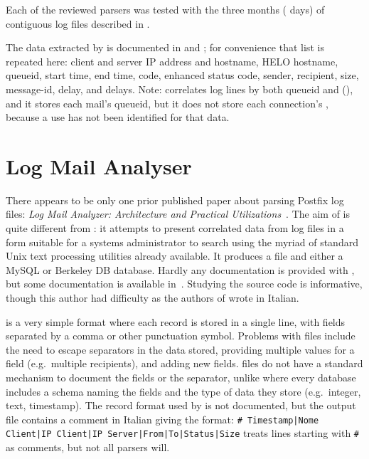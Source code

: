 Each of the reviewed parsers was tested with the three months
(\numberOFlogFILES{} days) of contiguous log files described in
.

The data extracted by \parsername{} is documented in
 and ; for
convenience that list is repeated here: client and server IP address and
hostname, HELO hostname, queueid, start time, end time, 
code, enhanced status code, sender, recipient, size, message-id, delay, and
delays.  Note: \parsername{} correlates log lines by both queueid and
 (), and it stores each mail's
queueid, but it does not store each connection's , because a
use has not been identified for that data.

\section{Log Mail Analyser}

\label{log mail analyser}

There appears to be only one prior published paper about parsing Postfix
log files: \textit{Log Mail Analyzer: Architecture and Practical
Utilizations\/}~\cite{log-mail-analyser}.  The aim of  is
quite different from \parsername{}: it attempts to present correlated data
from log files in a form suitable for a systems administrator to search
using the myriad of standard Unix text processing utilities already
available.  It produces a  file and either a MySQL or Berkeley
DB database.  Hardly any documentation is provided with , but
some documentation is available in~\cite{log-mail-analyser}.  Studying the
source code is informative, though this author had difficulty as the
authors of  wrote in Italian.

 is a very simple format where each record is stored in a
single line, with fields separated by a comma or other punctuation symbol.
Problems with  files include the need to escape separators in
the data stored, providing multiple values for a field (e.g.\ multiple
recipients), and adding new fields.   files do not have a
standard mechanism to document the fields or the separator, unlike
 where every database includes a schema naming the fields and
the type of data they store (e.g.\ integer, text, timestamp).  The
 record format used by  is not documented, but
the output file contains a comment in Italian giving the format:\newline{}
\texttt{\# Timestamp|Nome Client|IP Client|IP Server|From|To|Status|Size}
\newline{} treats  lines starting with
\texttt{\#} as comments, but not all  parsers will.

